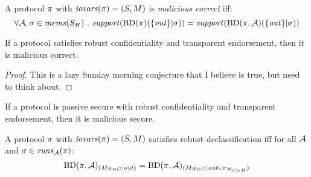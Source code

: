 \begin{definition}
  A protocol $\pi$ with $\mathit{iovars}(\pi) = (S,M)$ is \emph{malicious correct} iff:
  $$
  \forall \mathcal{A}, \sigma \in \mathit{mems}(S_H) \ .\ \mathit{support}(\mathrm{BD}(\pi)(\{ \mathit{out} \}|\sigma)) =
    \mathit{support}(\mathrm{BD}(\pi,\mathcal{A})(\{ \mathit{out} \}|\sigma))
  $$
\end{definition}

\begin{theorem}
  If a protocol satisfies robust confidentiality and transparent endorsement, then it is
  malicious correct.
\end{theorem}
\begin{proof}
  This is a lazy Sunday morning conjecture that I believe is true, but need to think
  about.
\end{proof}

\begin{theorem}
  If a protocol is passive secure with robust confidentiality and
  transparent endorsement, then it is malicious secure.
\end{theorem}

\begin{lemma}
  A protocol $\pi$ with $\mathit{iovars}(\pi) = (S,M)$ satisfies robust declassification iff for all $\mathcal{A}$
  and $\sigma \in \mathit{runs}_{\mathcal{A}}(\pi)$:
  $$
  \mathrm{BD}(\pi,\mathcal{A})_{({M_{H \rhd C}}|{\mathit{out}})} =
  \mathrm{BD}(\pi,\mathcal{A})_{({M_{H \rhd C}}|{\mathit{out} \cup \sigma_{M_{C \rhd H}}})}
  $$
\end{lemma}





